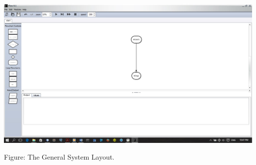 \documentclass[11pt,a4paper,titlepage]{article}
\begin{document}
		\includegraphics[width=\textwidth]{images/SystemLayout.jpg}
		\begin{center}
		Figure: The General System Layout.\newline
		\end{center}
		
\end{document}

